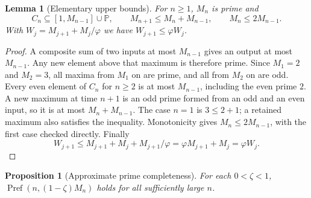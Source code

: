 \documentclass[11pt,letterpaper]{article}
\numberwithin{equation}{section}
\newtheorem{lemma}[theorem]{Lemma}
\newtheorem{proposition}[theorem]{Proposition}
\theoremstyle{remark}
\newcommand{\Pp}{\mathbb P}
\newcommand{\ph}{\varphi}
\begin{document}
\begin{lemma}[Elementary upper bounds]\label{lem:elementary}
For $n\ge1$, $M_n$ is prime and
\begin{equation}\label{eq:elementary}
 C_n\subseteq[1,M_{n-1}]\cup\Pp,\qquad
 M_{n+1}\le M_n+M_{n-1},\qquad M_n\le2M_{n-1}.
\end{equation}
With $W_j=M_{j+1}+M_j/\ph$ we have $W_{j+1}\le\ph W_j$.
\end{lemma}

\begin{proof}
A composite sum of two inputs at most $M_{n-1}$ gives an output at most
$M_{n-1}$. Any new element above that maximum is therefore prime.
Since $M_1=2$ and $M_2=3$, all maxima from $M_1$ on are prime, and all
from $M_2$ on are odd. Every even element of $C_n$ for $n\ge2$ is at
most $M_{n-1}$, including the even prime $2$. A new maximum at time
$n+1$ is an odd prime formed from an odd and an even input, so it is
at most $M_n+M_{n-1}$. The case $n=1$ is $3\le2+1$; a retained
maximum also satisfies the inequality. Monotonicity gives
$M_n\le2M_{n-1}$, with the first case checked directly. Finally
\[
 W_{j+1}\le M_{j+1}+M_j+M_{j+1}/\ph
 =\ph M_{j+1}+M_j=\ph W_j.
\]
\end{proof}

\begin{proposition}[Approximate prime completeness]\label{prop:prefix-close}
For each $0<\zeta<1$, $\operatorname{Pref}(n,(1-\zeta)M_n)$ holds for
all sufficiently large $n$.
\end{proposition}
\end{document}

